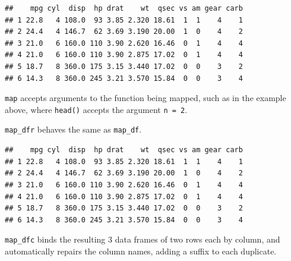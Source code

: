\documentclass[]{book}
\newenvironment{Shaded}{}{}
\newcommand{\CommentTok}[1]{\textcolor[rgb]{0.38,0.63,0.69}{\textit{#1}}}
\newcommand{\DataTypeTok}[1]{\textcolor[rgb]{0.56,0.13,0.00}{#1}}
\newcommand{\DecValTok}[1]{\textcolor[rgb]{0.25,0.63,0.44}{#1}}
\newcommand{\KeywordTok}[1]{\textcolor[rgb]{0.00,0.44,0.13}{\textbf{#1}}}
\newcommand{\NormalTok}[1]{#1}
\newcommand{\OperatorTok}[1]{\textcolor[rgb]{0.40,0.40,0.40}{#1}}
\newcommand{\StringTok}[1]{\textcolor[rgb]{0.25,0.44,0.63}{#1}}
\begin{document}
\begin{Shaded}
\end{Shaded}

\begin{verbatim}
##    mpg cyl  disp  hp drat    wt  qsec vs am gear carb
## 1 22.8   4 108.0  93 3.85 2.320 18.61  1  1    4    1
## 2 24.4   4 146.7  62 3.69 3.190 20.00  1  0    4    2
## 3 21.0   6 160.0 110 3.90 2.620 16.46  0  1    4    4
## 4 21.0   6 160.0 110 3.90 2.875 17.02  0  1    4    4
## 5 18.7   8 360.0 175 3.15 3.440 17.02  0  0    3    2
## 6 14.3   8 360.0 245 3.21 3.570 15.84  0  0    3    4
\end{verbatim}

\texttt{map} accepts arguments to the function being mapped, such as in the example above, where \texttt{head()} accepts the argument \texttt{n\ =\ 2}.

\texttt{map\_dfr} behaves the same as \texttt{map\_df}.

\begin{Shaded}
\end{Shaded}

\begin{verbatim}
##    mpg cyl  disp  hp drat    wt  qsec vs am gear carb
## 1 22.8   4 108.0  93 3.85 2.320 18.61  1  1    4    1
## 2 24.4   4 146.7  62 3.69 3.190 20.00  1  0    4    2
## 3 21.0   6 160.0 110 3.90 2.620 16.46  0  1    4    4
## 4 21.0   6 160.0 110 3.90 2.875 17.02  0  1    4    4
## 5 18.7   8 360.0 175 3.15 3.440 17.02  0  0    3    2
## 6 14.3   8 360.0 245 3.21 3.570 15.84  0  0    3    4
\end{verbatim}

\texttt{map\_dfc} binds the resulting 3 data frames of two rows each by column, and automatically repairs the column names, adding a suffix to each duplicate.
\end{document}
